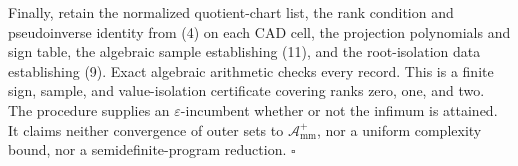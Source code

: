 Finally, retain the normalized quotient-chart list, the rank condition and pseudoinverse identity from (4) on each CAD cell, the projection polynomials and sign table, the algebraic sample establishing (11), and the root-isolation data establishing (9).  Exact algebraic arithmetic checks every record.  This is a finite sign, sample, and value-isolation certificate covering ranks zero, one, and two.  The procedure supplies an \(\varepsilon\)-incumbent whether or not the infimum is attained.  It claims neither convergence of outer sets to \(\mathcal A_{\mathrm{mm}}^+\), nor a uniform complexity bound, nor a semidefinite-program reduction. \(\square\)